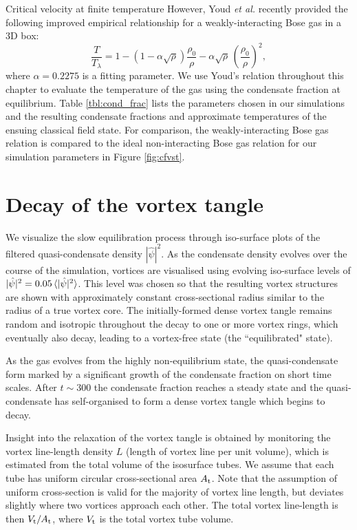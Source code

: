 \begin{chapter}{\label{cha:nonequib}Critical velocity at finite temperature}
However, Youd {\it et al.} \cite{berloff_2007} recently provided the following improved empirical relationship for a weakly-interacting Bose gas in a 3D box:
\begin{equation}
  \frac{T}{T_\lambda} = 1 - (1 - \alpha\sqrt{\rho})\frac{\rho_0}{\rho} - \alpha\sqrt{\rho}\,\left(\frac{\rho_0}{\rho}\right)^2,
  \label{eq:temp}
\end{equation}
where $\alpha=0.2275$ is a fitting parameter. We use Youd's relation throughout this chapter to evaluate the temperature of the gas using the condensate fraction at equilibrium. Table \ref{tbl:cond_frac} lists the parameters chosen in our simulations and the resulting condensate fractions and approximate temperatures of the ensuing classical field state. For comparison, the weakly-interacting Bose gas relation is compared to the ideal non-interacting Bose gas relation for our simulation parameters in Figure \ref{fig:cfvst}.

\section{Decay of the vortex tangle} \label{sec:tangle}
We visualize the slow equilibration process through iso-surface plots of the filtered quasi-condensate density $|\hat{\psi}|^2$. As the condensate density evolves over the course of the simulation, vortices are visualised using evolving iso-surface levels of $|\hat{\psi}|^2 = 0.05\braket{|\hat{\psi}|^2}$. This level was chosen so that the resulting vortex structures are shown with approximately constant cross-sectional radius similar to the radius of a true vortex core. The initially-formed dense vortex tangle remains random and isotropic throughout the decay to one or more vortex rings, which eventually also decay, leading to a vortex-free state (the ``equilibrated" state).

As the gas evolves from the highly non-equilibrium state, the quasi-condensate form marked by a significant growth of the condensate fraction on short time scales. After $t \sim 300$ the condensate fraction reaches a steady state and the quasi-condensate has self-organised to form a dense vortex tangle which begins to decay.

Insight into the relaxation of the vortex tangle is obtained by monitoring
the vortex line-length density $L$ (length of vortex line per
unit volume), which is estimated from
the total volume of the isosurface tubes.
We assume that each tube has uniform circular cross-sectional
area $A_{\rm t}$. Note that the assumption of uniform cross-section is
valid for the majority of vortex line length, but deviates
slightly where two vortices approach each other.
The total vortex line-length is then $V_{\rm t}/A_{\rm t}$, where $V_{\rm t}$ is the total vortex tube volume.


\end{chapter}
